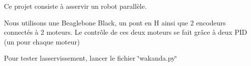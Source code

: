 Ce projet consiste à asservir un robot parallèle.

Nous utilisons une Beaglebone Black, un pont en H ainsi que 2 encodeurs connectés à 2 moteurs. Le contrôle de ces deux moteurs se fait grâce à deux P\+ID (un pour chaque moteur)

Pour tester l\textquotesingle{}asservissement, lancer le fichier \char`\"{}wakanda.\+py\char`\"{} 